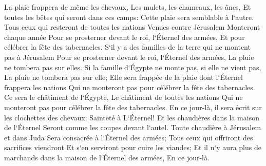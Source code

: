 \verse La plaie frappera de même les chevaux, Les mulets, les chameaux, les ânes, Et toutes les bêtes qui seront dans ces camps: Cette plaie sera semblable à l`autre. 
\verse Tous ceux qui resteront de toutes les nations Venues contre Jérusalem Monteront chaque année Pour se prosterner devant le roi, l`Éternel des armées, Et pour célébrer la fête des tabernacles. 
\verse S`il y a des familles de la terre qui ne montent pas à Jérusalem Pour se prosterner devant le roi, l`Éternel des armées, La pluie ne tombera pas sur elles. 
\verse Si la famille d`Égypte ne monte pas, si elle ne vient pas, La pluie ne tombera pas sur elle; Elle sera frappée de la plaie dont l`Éternel frappera les nations Qui ne monteront pas pour célébrer la fête des tabernacles. 
\verse Ce sera le châtiment de l`Égypte, Le châtiment de toutes les nations Qui ne monteront pas pour célébrer la fête des tabernacles. 
\verse En ce jour-là, il sera écrit sur les clochettes des chevaux: Sainteté à L`Éternel! Et les chaudières dans la maison de l`Éternel Seront comme les coupes devant l`autel. 
\verse Toute chaudière à Jérusalem et dans Juda Sera consacrée à l`Éternel des armées; Tous ceux qui offriront des sacrifices viendront Et s`en serviront pour cuire les viandes; Et il n`y aura plus de marchands dans la maison de l`Éternel des armées, En ce jour-là. 
